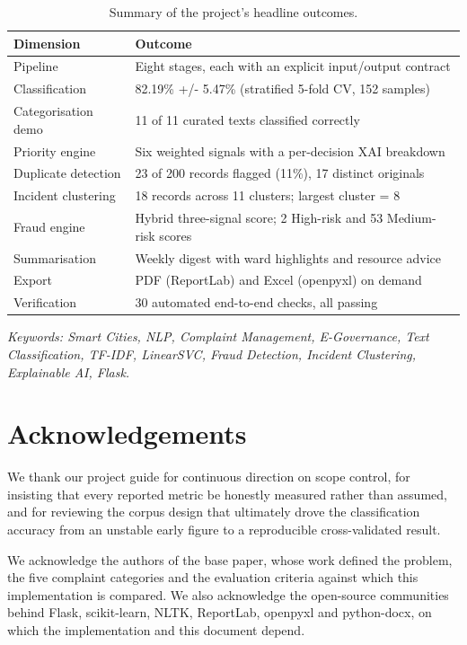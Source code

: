 \documentclass[10pt,letterpaper,oneside]{article}\usepackage{geometry}\geometry{top=1in,bottom=1in,left=1in,right=1in,includeheadfoot}\usepackage{xcolor}\definecolor{color@navy}{HTML}{1F3B63}\definecolor{color@grey}{HTML}{404040}\definecolor{color@hdr}{HTML}{F2F4F7}\usepackage{titlesec}\titleformat{\section}  {\normalfont\huge\bfseries\color@navy}  {}{0pt}{\MakeUppercase}\titleformat{\subsection}  {\normalfont\Large\bfseries\color@navy}  {}{0pt}{}\titleformat{\subsubsection}  {\normalfont\large\bfseries\color@navy}  {}{0pt}{}\titlespacing*{\section}{0pt}{14pt}{6pt}\titlespacing*{\subsection}{0pt}{10pt}{4pt}\titlespacing*{\subsubsection}{0pt}{8pt}{3pt}\setlength{\parindent}{0pt}\setlength{\parskip}{0.6em}\parindent=0pt\usepackage{enumitem}\setlist{nosep,leftmargin=*,itemsep=0pt,topsep=2pt,partopsep=0pt}\usepackage{array}\usepackage{booktabs}\usepackage{caption}\captionsetup{font={small,it},labelfont={bf},labelsep=period,  parskip=2pt,skip=4pt,list=no}\captionsetup[table]{labelfont={bf,small,color@navy},name=Table}\usepackage{graphicx}\usepackage{verbatim}\usepackage{ragged2e}\usepackage{longtable}\usepackage{tabularx}\usepackage{multirow}\usepackage{colortbl}\definecolor{rowshade}{HTML}{F2F4F7}\usepackage{tikz}\usetikzlibrary{positioning,calc}\usepackage[hidelinks]{hyperref}\hypersetup{colorlinks=true,linkcolor=color@navy,urlcolor=color@navy}\pagestyle{fancy}\fancyhf{}\renewcommand{\headrulewidth}{0.4pt}\fancyhead[L]{\small\color@navy CivicSense — Project Report}\fancyhead[R]{\small\color@grey October 11, 2026}\fancyfoot[C]{\small\color@grey An Integrated Intelligent Triage Pipelin}\fancyfoot[R]{\small\color@grey Page \thepage}\usepackage{setspace}\setstretch{1.15}\AtBeginDocument{  \hypersetup{pdftitle={An Integrated Intelligent Triage Pipeline for AI-Enhanced Citizen Complaint Management},    pdfauthor={CivicSense Project Team},    pdfsubject={Project Report},    pdfkeywords={smart cities, NLP, complaint management, e-governance},    pdfcreator={CivicSense Project Team}  }}
\begin{document}
\begin{table}[htbp]
\centering
\small
\begin{tabular}{@{}ll@{}}
\toprule
Dimension & Outcome \\
\midrule
Pipeline & Eight stages, each with an explicit input/output contract \\
Classification & 82.19\% +/- 5.47\% (stratified 5-fold CV, 152 samples) \\
Categorisation demo & 11 of 11 curated texts classified correctly \\
Priority engine & Six weighted signals with a per-decision XAI breakdown \\
Duplicate detection & 23 of 200 records flagged (11\%), 17 distinct originals \\
Incident clustering & 18 records across 11 clusters; largest cluster = 8 \\
Fraud engine & Hybrid three-signal score; 2 High-risk and 53 Medium-risk scores \\
Summarisation & Weekly digest with ward highlights and resource advice \\
Export & PDF (ReportLab) and Excel (openpyxl) on demand \\
Verification & 30 automated end-to-end checks, all passing \\
\bottomrule
\end{tabular}
\caption{Summary of the project’s headline outcomes.}
\end{table}

\emph{Keywords: Smart Cities, NLP, Complaint Management, E-Governance, Text Classification, TF-IDF, LinearSVC, Fraud Detection, Incident Clustering, Explainable AI, Flask.}
\newpage
{}
{}
\section*{Acknowledgements}

We thank our project guide for continuous direction on scope control, for insisting that every reported metric be honestly measured rather than assumed, and for reviewing the corpus design that ultimately drove the classification accuracy from an unstable early figure to a reproducible cross-validated result.

We acknowledge the authors of the base paper, whose work defined the problem, the five complaint categories and the evaluation criteria against which this implementation is compared. We also acknowledge the open-source communities behind Flask, scikit-learn, NLTK, ReportLab, openpyxl and python-docx, on which the implementation and this document depend.
\end{document}
